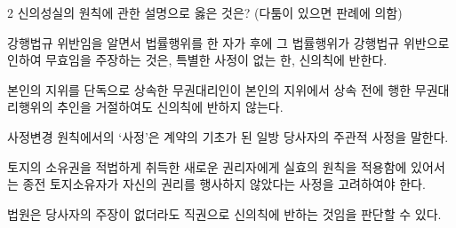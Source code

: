 \begin{question}{2}
신의성실의 원칙에 관한 설명으로 옳은 것은? (다툼이 있으면 판례에 의함)
\begin{choices}
  \item 강행법규 위반임을 알면서 법률행위를 한 자가 후에 그 법률행위가 강행법규 위반으로 인하여 무효임을 주장하는 것은, 특별한 사정이 없는 한, 신의칙에 반한다.
  \item 본인의 지위를 단독으로 상속한 무권대리인이 본인의 지위에서 상속 전에 행한 무권대리행위의 추인을 거절하여도 신의칙에 반하지 않는다.
  \item 사정변경 원칙에서의 ‘사정’은 계약의 기초가 된 일방 당사자의 주관적 사정을 말한다.
  \item 토지의 소유권을 적법하게 취득한 새로운 권리자에게 실효의 원칙을 적용함에 있어서는 종전 토지소유자가 자신의 권리를 행사하지 않았다는 사정을 고려하여야 한다.
  \item 법원은 당사자의 주장이 없더라도 직권으로 신의칙에 반하는 것임을 판단할 수 있다.
\end{choices}
\end{question}
